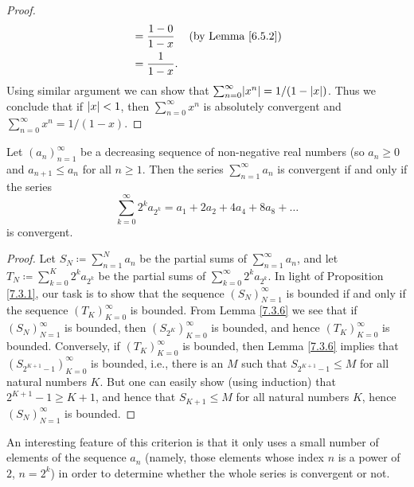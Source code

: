 \begin{proof}
\begin{align*}
                                & = \frac{1 - 0}{1 - x}                                                     & \text{(by Lemma \ref{6.5.2})}      \\
                                & = \frac{1}{1 - x}.
    \end{align*}
    Using similar argument we can show that \(\sum_{n = 0}^\infty \abs*{x^n} = 1 / (1 - \abs*{x})\).
    Thus we conclude that if \(\abs*{x} < 1\), then \(\sum_{n = 0}^\infty x^n\) is absolutely convergent and \(\sum_{n = 0}^\infty x^n = 1 / (1 - x)\).
\end{proof}

\begin{proposition}\label{7.3.4}
    Let \((a_n)_{n = 1}^\infty\) be a decreasing sequence of non-negative real numbers (so \(a_n \geq 0\) and \(a_{n + 1} \leq a_n\) for all \(n \geq 1\).
    Then the series \(\sum_{n = 1}^\infty a_n\) is convergent if and only if the series
    \[
        \sum_{k = 0}^\infty 2^k a_{2^k} = a_1 + 2a_2 + 4a_4 + 8a_8 + \dots
    \]
    is convergent.
\end{proposition}

\begin{proof}
    Let \(S_N \coloneqq \sum_{n = 1}^N a_n\) be the partial sums of \(\sum_{n = 1}^\infty a_n\), and let \(T_N \coloneqq \sum_{k = 0}^K 2^k a_{2^k}\) be the partial sums of \(\sum_{k = 0}^\infty 2^k a_{2^k}\).
    In light of Proposition \ref{7.3.1}, our task is to show that the sequence \((S_N)_{N = 1}^\infty\) is bounded if and only if the sequence \((T_K)_{K = 0}^\infty\) is bounded.
    From Lemma \ref{7.3.6} we see that if \((S_N)_{N = 1}^\infty\) is bounded, then \((S_{2^K})_{K = 0}^\infty\) is bounded, and hence \((T_K)_{K = 0}^\infty\) is bounded.
    Conversely, if \((T_K)_{K = 0}^\infty\) is bounded, then Lemma \ref{7.3.6} implies that \((S_{2^{K + 1} - 1})_{K = 0}^\infty\) is bounded, i.e., there is an \(M\) such that \(S_{2^{K + 1} - 1} \leq M\) for all natural numbers \(K\).
    But one can easily show (using induction) that \(2^{K + 1} - 1 \geq K + 1\), and hence that \(S_{K + 1} \leq M\) for all natural numbers \(K\), hence \((S_N)_{N = 1}^\infty\) is bounded.
\end{proof}

\begin{remark}\label{7.3.5}
    An interesting feature of this criterion is that it only uses a small number of elements of the sequence \(a_n\)
    (namely, those elements whose index \(n\) is a power of \(2\), \(n = 2^k\))
    in order to determine whether the whole series is convergent or not.
\end{remark}

